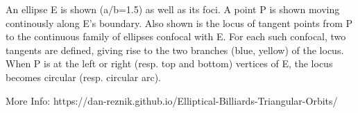 An ellipse E is shown (a/b=1.5) as well as its foci. A point P is shown moving continously along E's boundary. Also shown is the locus of tangent points from P to the continuous family of ellipses confocal with E. For each such confocal, two tangents are defined, giving rise to the two branches (blue, yellow) of the locus.  When P is at the left or right (resp. top and bottom) vertices of E, the locus becomes circular (resp. circular arc).

More Info: https://dan-reznik.github.io/Elliptical-Billiards-Triangular-Orbits/